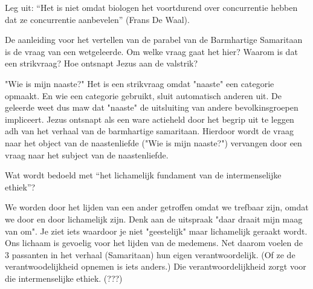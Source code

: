 \documentclass[main.tex]{subfiles}
\begin{document}
\begin{examenvraag}
    \begin{vraag}
        Leg uit: “Het is niet omdat biologen het voortdurend over concurrentie hebben dat ze concurrentie aanbevelen” (Frans De Waal).
    \end{vraag}

    \begin{antwoord}
    \end{antwoord}
\end{examenvraag}


\begin{examenvraag}
    \begin{vraag}
        De aanleiding voor het vertellen van de parabel van de Barmhartige Samaritaan is de vraag van een wetgeleerde. Om welke vraag gaat het hier? Waarom is dat een strikvraag? Hoe ontsnapt Jezus aan de valstrik?
    \end{vraag}

    \begin{antwoord}
		"Wie is mijn naaste?"
		Het is een strikvraag omdat "naaste" een categorie opmaakt. 
		En wie een categorie gebruikt, sluit automatisch anderen uit.
		De geleerde weet dus maw dat "naaste" de uitsluiting van andere bevolkinsgroepen impliceert.
		Jezus ontsnapt als een ware actieheld door het begrip uit te leggen adh van het verhaal van de barmhartige samaritaan.
		Hierdoor wordt de vraag naar het object van de naastenliefde ("Wie is mijn naaste?")  vervangen door een vraag naar het subject van de naastenliefde.
		
		    
    
    \end{antwoord}
\end{examenvraag}


\begin{examenvraag}
    \begin{vraag}
        Wat wordt bedoeld met “het lichamelijk fundament van de intermenselijke ethiek”?
    \end{vraag}

    \begin{antwoord}
       We worden door het lijden van een ander getroffen omdat we trefbaar zijn, omdat we door en door lichamelijk zijn.
       Denk aan de uitspraak "daar draait mijn maag van om". 
       Je ziet iets waardoor je niet "geestelijk" maar lichamelijk geraakt wordt.
       Ons lichaam is gevoelig voor het lijden van de medemens.
       Net daarom voelen de 3 passanten in het verhaal (Samaritaan) hun eigen verantwoordelijk.
       (Of ze de verantwoodelijkheid opnemen is iets anders.)
       Die verantwoordelijkheid zorgt voor die intermenselijke ethiek. (???)

    \end{antwoord}
\end{examenvraag}
\end{document}
